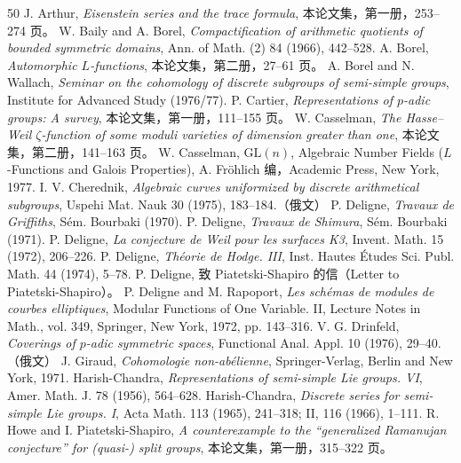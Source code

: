 \begin{thebibliography}{50}
 J. Arthur, \textit{Eisenstein series and the trace formula}, 本论文集，第一册，253--274 页。
 W. Baily and A. Borel, \textit{Compactification of arithmetic quotients of bounded symmetric domains}, Ann. of Math. (2) 84 (1966), 442--528.
 A. Borel, \textit{Automorphic $L$-functions}, 本论文集，第二册，27--61 页。
 A. Borel and N. Wallach, \textit{Seminar on the cohomology of discrete subgroups of semi-simple groups}, Institute for Advanced Study (1976/77).
 P. Cartier, \textit{Representations of $p$-adic groups: A survey}, 本论文集，第一册，111--155 页。
 W. Casselman, \textit{The Hasse--Weil $\zeta$-function of some moduli varieties of dimension greater than one}, 本论文集，第二册，141--163 页。
 W. Casselman, \textit{$\mathrm{GL}(n)$}, Algebraic Number Fields ($L$-Functions and Galois Properties), A. Fröhlich 编，Academic Press, New York, 1977.
 I. V. Cherednik, \textit{Algebraic curves uniformized by discrete arithmetical subgroups}, Uspehi Mat. Nauk 30 (1975), 183--184.（俄文）
 P. Deligne, \textit{Travaux de Griffiths}, Sém. Bourbaki (1970).
 P. Deligne, \textit{Travaux de Shimura}, Sém. Bourbaki (1971).
 P. Deligne, \textit{La conjecture de Weil pour les surfaces K3}, Invent. Math. 15 (1972), 206--226.
 P. Deligne, \textit{Théorie de Hodge. III}, Inst. Hautes Études Sci. Publ. Math. 44 (1974), 5--78.
 P. Deligne, 致 Piatetski-Shapiro 的信（Letter to Piatetski-Shapiro）。
 P. Deligne and M. Rapoport, \textit{Les schémas de modules de courbes elliptiques}, Modular Functions of One Variable. II, Lecture Notes in Math., vol. 349, Springer, New York, 1972, pp. 143--316.
 V. G. Drinfeld, \textit{Coverings of $p$-adic symmetric spaces}, Functional Anal. Appl. 10 (1976), 29--40.（俄文）
 J. Giraud, \textit{Cohomologie non-abélienne}, Springer-Verlag, Berlin and New York, 1971.
 Harish-Chandra, \textit{Representations of semi-simple Lie groups. VI}, Amer. Math. J. 78 (1956), 564--628.
 Harish-Chandra, \textit{Discrete series for semi-simple Lie groups. I}, Acta Math. 113 (1965), 241--318; II, 116 (1966), 1--111.
 R. Howe and I. Piatetski-Shapiro, \textit{A counterexample to the ``generalized Ramanujan conjecture'' for (quasi-) split groups}, 本论文集，第一册，315--322 页。

\end{thebibliography}
